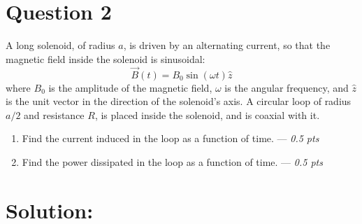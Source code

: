 \section*{Question 2}
A long solenoid, of radius $a$, is driven by an alternating current, so that the magnetic field inside the solenoid is sinusoidal:
\begin{equation*}
\vec{B}(t) = B_0 \sin(\omega t) \hat{z}
\end{equation*}
where $B_0$ is the amplitude of the magnetic field, $\omega$ is the angular frequency, and $\hat{z}$ is the unit vector in the direction of the solenoid's axis. A circular loop of radius $a/2$ and resistance $R$, is placed inside the solenoid, and is coaxial with it. 
\begin{enumerate}
  \item[(a)] Find the current induced in the loop as a function of time. --- \textit{0.5 pts}
  \item[(b)] Find the power dissipated in the loop as a function of time. --- \textit{0.5 pts}
\end{enumerate}

\section*{Solution:}

